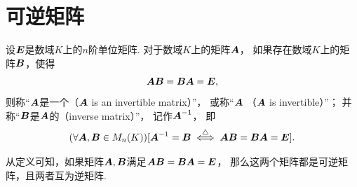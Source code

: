 \section{可逆矩阵}

\begin{definition}\label{definition:可逆矩阵.可逆矩阵的定义}
设\(\boldsymbol{E}\)是数域\(K\)上的\(n\)阶单位矩阵.
对于数域\(K\)上的矩阵\(\boldsymbol{A}\)，
如果存在数域\(K\)上的矩阵\(\boldsymbol{B}\)，使得\begin{equation*}
	\boldsymbol{A}\boldsymbol{B}=\boldsymbol{B}\boldsymbol{A}=\boldsymbol{E},
\end{equation*}
则称“\(\boldsymbol{A}\)是一个（\(\boldsymbol{A}\) is an invertible matrix）”，
或称“\(\boldsymbol{A}\) （\(\boldsymbol{A}\) is invertible）”；
并称“\(\boldsymbol{B}\)是\(\boldsymbol{A}\)的（inverse matrix）”，
记作\(\boldsymbol{A}^{-1}\)，
即\begin{equation*}
	(\forall \boldsymbol{A},\boldsymbol{B}\in M_n(K))
	[\boldsymbol{A}^{-1} = \boldsymbol{B} \overset{\triangle}{\iff} \boldsymbol{A}\boldsymbol{B}=\boldsymbol{B}\boldsymbol{A}=\boldsymbol{E}].
\end{equation*}
\end{definition}

从定义可知，如果矩阵\(\boldsymbol{A},\boldsymbol{B}\)满足\(\boldsymbol{A}\boldsymbol{B}=\boldsymbol{B}\boldsymbol{A}=\boldsymbol{E}\)，
那么这两个矩阵都是可逆矩阵，且两者互为逆矩阵.


